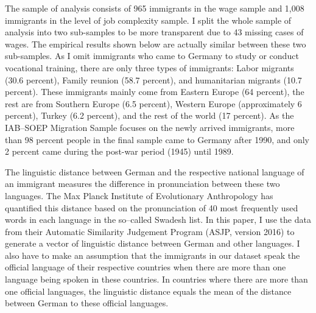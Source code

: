 \documentclass[12pt,a4paper]{article}
\begin{document}
The sample of analysis consists of 965 immigrants in the wage sample and 1,008 immigrants in the level of job complexity sample. I split the whole sample of analysis into two sub-samples to be more transparent due to 43 missing cases of wages. The empirical results shown below are actually similar between these two sub-samples. As I omit immigrants who came to Germany to study or conduct vocational training, there are only three types of immigrants: Labor migrants (30.6 percent), Family reunion (58.7 percent), and humanitarian migrants (10.7 percent). These immigrants mainly come from Eastern Europe (64 percent), the rest are from Southern Europe (6.5 percent), Western Europe (approximately 6 percent), Turkey (6.2 percent), and the rest of the world (17 percent). As the IAB--SOEP Migration Sample focuses on the newly arrived immigrants, more than 98 percent people in the final sample came to Germany after 1990, and only 2 percent came during the post-war period (1945) until 1989. 

The linguistic distance between German and the respective national language of an immigrant measures the difference in pronunciation between these two languages. The Max Planck Institute of Evolutionary Anthropology has quantified this distance based on the pronunciation of 40 most frequently used words in each language in the so--called Swadesh list. In this paper, I use the data from their Automatic Similarity Judgement Program (ASJP, version 2016) to generate a vector of linguistic distance between German and other languages. I also have to make an assumption that the immigrants in our dataset speak the official language of their respective countries when there are more than one language being spoken in these countries. In countries where there are more than one official languages, the linguistic distance equals the mean of the distance between German to these official languages.

\end{document}
